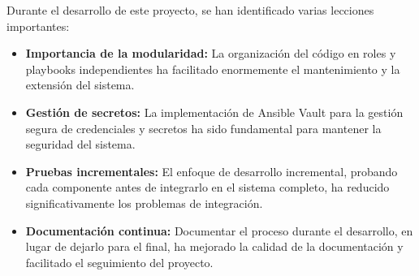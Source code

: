 \documentclass[12pt,a4paper]{report}
\begin{document}
Durante el desarrollo de este proyecto, se han identificado varias lecciones importantes:

\begin{itemize}
    \item \textbf{Importancia de la modularidad:} La organización del código en roles y playbooks independientes ha facilitado enormemente el mantenimiento y la extensión del sistema.
    
    \item \textbf{Gestión de secretos:} La implementación de Ansible Vault para la gestión segura de credenciales y secretos ha sido fundamental para mantener la seguridad del sistema.
    
    \item \textbf{Pruebas incrementales:} El enfoque de desarrollo incremental, probando cada componente antes de integrarlo en el sistema completo, ha reducido significativamente los problemas de integración.
    
    \item \textbf{Documentación continua:} Documentar el proceso durante el desarrollo, en lugar de dejarlo para el final, ha mejorado la calidad de la documentación y facilitado el seguimiento del proyecto.
\end{itemize}
\end{document}

